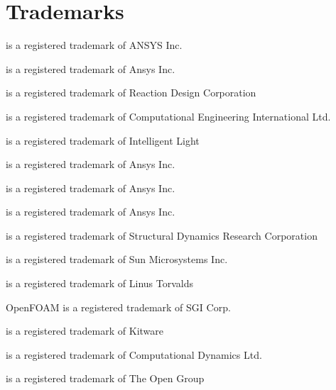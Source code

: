 
\section*{Trademarks}
 is a registered trademark of ANSYS Inc.\par
{} is a registered trademark of Ansys Inc.\par
{} is a registered trademark of Reaction Design Corporation\par
{} is a registered trademark of Computational Engineering International Ltd.\par
{} is a registered trademark of Intelligent Light\par
{} is a registered trademark of Ansys Inc.\par
{} is a registered trademark of Ansys Inc.\par
{} is a registered trademark of Ansys Inc.\par
{} is a registered trademark of Structural Dynamics Research Corporation\par
{} is a registered trademark of Sun Microsystems Inc.\par
{} is a registered trademark of Linus Torvalds\par
OpenFOAM is a registered trademark of SGI Corp.\par
{} is a registered trademark of Kitware\par
{} is a registered trademark of Computational Dynamics Ltd.\par
{} is a registered trademark of The Open Group\par
